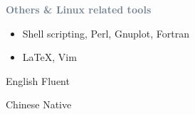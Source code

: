 \textcolor{SlateGrey}{\textbf{Others \& Linux related tools}}
\newline

\begin{itemize}
    \item Shell scripting, Perl, Gnuplot, Fortran 
    \item \LaTeX, Vim
\end{itemize}



English \hfill  Fluent

\divider

Chinese \hfill Native 




